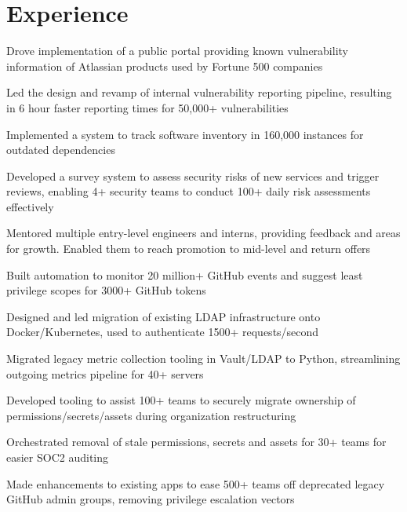 \documentclass[]{deedy-resume}
\begin{document}
%
%



\section{Experience}

\begin{tightemize}
\item Drove implementation of a public portal providing known vulnerability information of Atlassian products used by Fortune 500 companies
\item Led the design and revamp of internal vulnerability reporting pipeline, resulting in 6 hour faster reporting times for 50,000+ vulnerabilities
\item Implemented a system to track software inventory in 160,000 instances for outdated dependencies
\item Developed a survey system to assess security risks of new services and trigger reviews, enabling 4+ security teams to conduct 100+ daily risk assessments effectively
\item Mentored multiple entry-level engineers and interns, providing feedback and areas for growth. Enabled them to reach promotion to mid-level and return offers
\end{tightemize}
\sectionsep

\begin{tightemize}
\item Built automation to monitor 20 million+ GitHub events and suggest least privilege scopes for 3000+ GitHub tokens
\item Designed and led migration of existing LDAP infrastructure onto Docker/Kubernetes, used to authenticate 1500+ requests/second
\item Migrated legacy metric collection tooling in Vault/LDAP to Python, streamlining outgoing metrics pipeline for 40+ servers
\item Developed tooling to assist 100+ teams to securely migrate ownership of permissions/secrets/assets during organization restructuring
\item Orchestrated removal of stale permissions, secrets and assets for 30+ teams for easier SOC2 auditing
\item Made enhancements to existing apps to ease 500+ teams off deprecated legacy GitHub admin groups, removing privilege escalation vectors
\end{tightemize}
\sectionsep
\end{document}
